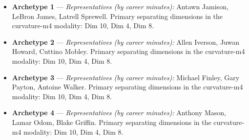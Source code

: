 \begin{itemize}
\item \textbf{Archetype 1} --- \emph{Representatives (by career minutes):} Antawn Jamison, LeBron James, Latrell Sprewell. Primary separating dimensions in the curvature-m4 modality: Dim 10, Dim 4, Dim 8.
\item \textbf{Archetype 2} --- \emph{Representatives (by career minutes):} Allen Iverson, Juwan Howard, Cuttino Mobley. Primary separating dimensions in the curvature-m4 modality: Dim 10, Dim 4, Dim 8.
\item \textbf{Archetype 3} --- \emph{Representatives (by career minutes):} Michael Finley, Gary Payton, Antoine Walker. Primary separating dimensions in the curvature-m4 modality: Dim 10, Dim 4, Dim 8.
\item \textbf{Archetype 4} --- \emph{Representatives (by career minutes):} Anthony Mason, Lamar Odom, Blake Griffin. Primary separating dimensions in the curvature-m4 modality: Dim 10, Dim 4, Dim 8.
\end{itemize}
